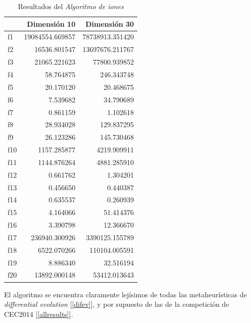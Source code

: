 \documentclass[a4paper,11pt]{article}
\begin{document}
 
  \begin{table}[H]	
  \caption{Resultados del \textit{Algoritmo de iones}}
  \centering
  \begin{tabular}{|l|r|r|}
  \hline
  &  \textbf{Dimensión 10}& \textbf{Dimensión 30} \\ \hline
  f1 &  19084554.669857 &  78738913.351420 \\ \hline
  f2 &  16536.801547 &  13697676.211767 \\ \hline
  f3 &  21065.221623 &  77800.939852 \\ \hline
  f4 &  58.764875 &  246.343748 \\ \hline
  f5 &  20.170120 &  20.468675 \\ \hline
  f6 &  7.539682 &  34.790689 \\ \hline
  f7 &  0.861159 &  1.102618 \\ \hline
  f8 &  28.934028 &  129.837295 \\ \hline
  f9 &  26.123286 &  145.730468 \\ \hline
  f10 &  1157.285877 &  4219.909911 \\ \hline
  f11 &  1144.876264 &  4881.285910 \\ \hline
  f12 &  0.661762 &  1.304201 \\ \hline
  f13 &  0.456650 &  0.440387 \\ \hline
  f14 &  0.635537 &  0.260939 \\ \hline
  f15 &  4.164066 &  51.414376 \\ \hline
  f16 &  3.390798 &  12.366670 \\ \hline
  f17 &  236940.300926 &  3390125.155789 \\ \hline
  f18 &  6522.070266 &  110104.005591 \\ \hline
  f19 &  8.886340 &  32.516194 \\ \hline
  f20 &  13892.000148 &  53412.013643 \\ \hline
  \end{tabular}  
  \label{ion-results}
  \end{table}

  El algoritmo se encuentra claramente lejísimos de todas las metaheurísticas de \textit{differential evolution} [\ref{difev}], y
  por supuesto de las de la competición de CEC2014 [\ref{allresults}].
\end{document}
